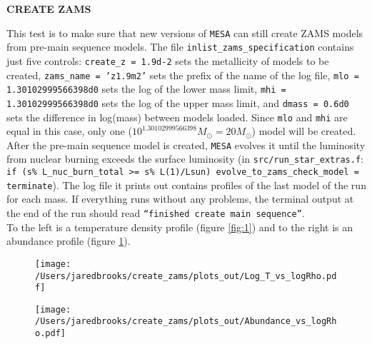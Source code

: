 \documentclass{article}
\begin{document}
	
	\begin{center}
	  \begin{Large}
	    \textbf{CREATE ZAMS}\\
	  \end{Large}
	\end{center}

        This test is to make sure that new versions of \texttt{MESA} can still create ZAMS models from pre-main sequence models.  The file \texttt{inlist\_zams\_specification} contains just five controls:  \texttt{create\_z = 1.9d-2} sets the metallicity of models to be created, \texttt{zams\_name = 'z1.9m2'} sets the prefix of the name of the log file, \texttt{mlo = 1.30102999566398d0} sets the log of the lower mass limit, \texttt{mhi = 1.30102999566398d0} sets the log of the upper mass limit, and \texttt{dmass = 0.6d0} sets the difference in log(mass) between models loaded.  Since \texttt{mlo} and \texttt{mhi} are equal in this case, only one ($10^{1.30102999566398}M_\odot=20 M_\odot$) model will be created.  After the pre-main sequence model is created, \texttt{MESA} evolves it until the luminosity from nuclear burning exceeds the surface luminosity (in \texttt{src/run\_star\_extras.f}: \texttt{if (s\% L\_nuc\_burn\_total >= s\% L(1)/Lsun) evolve\_to\_zams\_check\_model = terminate}).  The log file it prints out contains profiles of the last model of the run for each mass.  If everything runs without any problems, the terminal output at the end of the run should read \texttt{``finished create main sequence''}.\\

        To the left is a temperature density profile (figure \ref{fig:1}) and to the right is an abundance profile (figure \ref{fig:2}).

        \begin{figure}[H]
          \begin{minipage}[b]{0.5\linewidth}
	    \centering
	    \texttt{[image: /Users/jaredbrooks/create\_zams/plots\_out/Log\_T\_vs\_logRho.pdf]}
	    \caption{}
	    \label{fig:1}
          \end{minipage}
          \hspace{0cm}
          \begin{minipage}[b]{0.5\linewidth}
            \centering
            \texttt{[image: /Users/jaredbrooks/create\_zams/plots\_out/Abundance\_vs\_logRho.pdf]}
            \caption{}
            \label{fig:2}
          \end{minipage}
	\end{figure}
\end{document}
